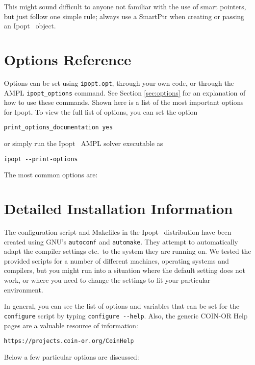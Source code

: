 \documentclass[10pt]{article}
\newcommand{\Ipopt}{{\sc Ipopt }}
\begin{document}
This might sound difficult to anyone not familiar with the use of
smart pointers, but just follow one simple rule; always use a SmartPtr
when creating or passing an \Ipopt\ object.

\newpage
\section{Options Reference} \label{app.options_ref}

Options can be set using {\tt ipopt.opt}, through your own code, or
through the AMPL {\tt ipopt\_options} command. See Section
\ref{sec:options} for an explanation of how to use these commands.
Shown here is a list of the most important options for Ipopt. To view
the full list of options, you can set the option 
\begin{verbatim}
print_options_documentation yes
\end{verbatim}
or simply run the \Ipopt\ AMPL solver executable as
\begin{verbatim}
ipopt --print-options
\end{verbatim}


The most common options are:



\newpage
\section{Detailed Installation Information}\label{ExpertInstall}

The configuration script and Makefiles in the \Ipopt\ distribution
have been created using GNU's {\tt autoconf} and {\tt automake}.  They
attempt to automatically adapt the compiler settings etc.\ to the
system they are running on.  We tested the provided scripts for a
number of different machines, operating systems and compilers, but you
might run into a situation where the default setting does not work, or
where you need to change the settings to fit your particular
environment.

In general, you can see the list of options and variables that can be
set for the {\tt configure} script by typing \verb/configure --help/.
Also, the generic COIN-OR Help pages are a valuable resource of
information:

\centerline{\tt https://projects.coin-or.org/CoinHelp}

Below a few particular options are discussed:
\end{document}
